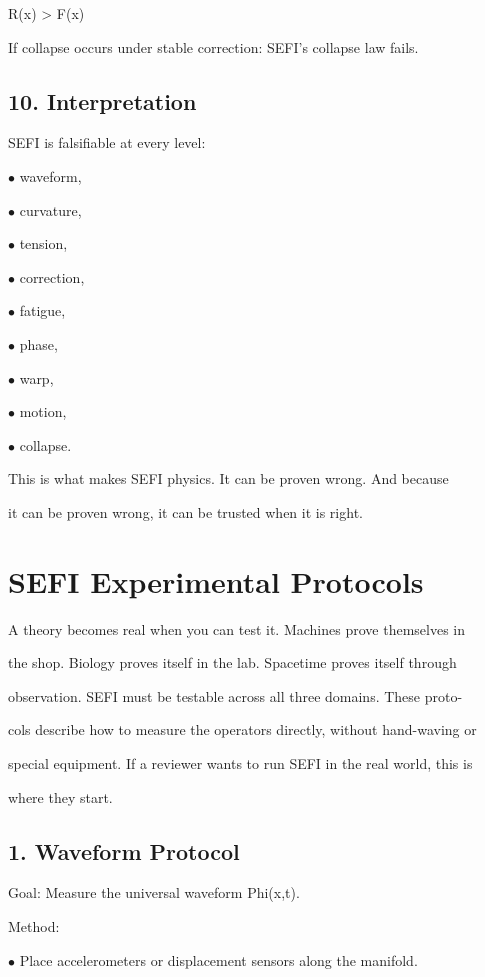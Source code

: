 \documentclass[10pt]{article}
\begin{document}
R(x) > F(x)

If collapse occurs under stable correction: SEFI's collapse law fails.

\subsection*{10. Interpretation}
SEFI is falsifiable at every level:

\noindent $\bullet$ waveform,

\noindent $\bullet$ curvature,

\noindent $\bullet$ tension,

\noindent $\bullet$ correction,

\noindent $\bullet$ fatigue,

\noindent $\bullet$ phase,

\noindent $\bullet$ warp,

\noindent $\bullet$ motion,

\noindent $\bullet$ collapse.

This is what makes SEFI physics. It can be proven wrong. And because

it can be proven wrong, it can be trusted when it is right.


\section*{SEFI Experimental Protocols}
A theory becomes real when you can test it. Machines prove themselves in

the shop. Biology proves itself in the lab. Spacetime proves itself through

observation. SEFI must be testable across all three domains. These proto-

cols describe how to measure the operators directly, without hand-waving or

special equipment. If a reviewer wants to run SEFI in the real world, this is

where they start.

\subsection*{1. Waveform Protocol}
Goal: Measure the universal waveform Phi(x,t).

Method:

\noindent $\bullet$ Place accelerometers or displacement sensors along the manifold.
\end{document}
